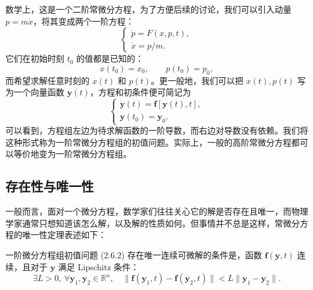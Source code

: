 数学上，这是一个二阶常微分方程，为了方便后续的讨论，我们可以引入动量 $p=m\dot{x}$，将其变成两个一阶方程：
\begin{equation}
\begin{cases}
\dot p=F(x,p,t),\\
\dot x=p/m.
\end{cases}
\tag{2.6.1}
\end{equation}
它们在初始时刻 $t_0$ 的值都是已知的：
\[
x(t_0)=x_0,\qquad p(t_0)=p_0,
\]
而希望求解任意时刻的 $x(t)$ 和 $p(t)$。更一般地，我们可以把 $x(t),p(t)$ 写为一个向量函数 $\bm y(t)$，方程和初条件便可简记为
\begin{equation}
\begin{cases}
\dot{\bm y}(t)=\bm f[\bm y(t),t],\\
\bm y(t_0)=\bm y_0.
\end{cases}
\tag{2.6.2}
\end{equation}
可以看到，方程组左边为待求解函数的一阶导数，而右边对导数没有依赖。我们将这种形式称为一阶常微分方程组的初值问题。实际上，一般的高阶常微分方程都可以等价地变为一阶常微分方程组。

\subsection{存在性与唯一性}

一般而言，面对一个微分方程，数学家们往往关心它的解是否存在且唯一，而物理学家通常只想知道该怎么解，以及解的性质如何。但事情并不总是这样，常微分方程的唯一性定理表述如下：

\begin{keybox}[定理 2.2]
一阶微分方程组初值问题 (2.6.2) 存在唯一连续可微解的条件是，函数 $\bm f(\bm y,t)$ 连续，且对于 $\bm y$ 满足 Lipschitz 条件：
\begin{equation}
\exists L>0,\ \forall \bm y_1,\bm y_2\in\mathbb R^n,\quad
\lVert \bm f(\bm y_1,t)-\bm f(\bm y_2,t)\rVert<L\lVert \bm y_1-\bm y_2\rVert.
\tag{2.6.3}
\end{equation}
\end{keybox}

